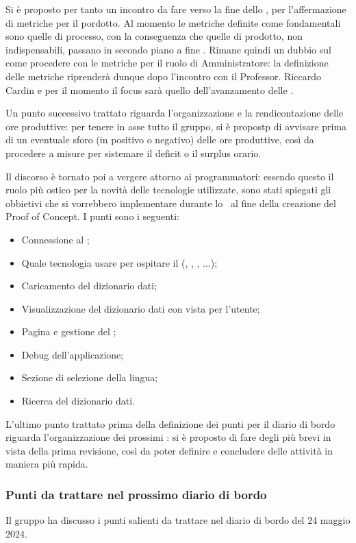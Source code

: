 Si è proposto per tanto un incontro da fare verso la fine dello , per l'affermazione di metriche per il pordotto.
Al momento le metriche definite come fondamentali sono quelle di processo, con la conseguenza che quelle di prodotto, non indispensabili, passano in secondo piano a fine .
Rimane quindi un dubbio sul come procedere con le metriche per il ruolo di Amministratore: la definizione delle metriche riprenderà dunque dopo l'incontro con il Professor. Riccardo Cardin e per il momento il focus sarà quello dell'avanzamento delle \NdP.
\par Un punto successivo trattato riguarda l'organizzazione e la rendicontazione delle ore produttive: per tenere in asse tutto il gruppo, si è propostp di avvisare prima di un eventuale sforo (in positivo o negativo) delle ore produttive, così da procedere a misure per sistemare il deficit o il surplus orario.
\par Il discorso è tornato poi a vergere attorno ai programmatori: essendo questo il ruolo più ostico per la novità delle tecnologie utilizzate, sono stati spiegati gli obbietivi che si vorrebbero implementare durante lo \ al fine della creazione del Proof of Concept. I punti sono i seguenti:
\begin{itemize}
	\item Connessione al ;
	\item Quale tecnologia usare per ospitare il  (, , , ...);
	\item Caricamento del dizionario dati;
	\item Visualizzazione del dizionario dati con vista per l'utente;
	\item Pagina e gestione del ; 
	\item Debug dell'applicazione;
	\item Sezione di selezione della lingua;
	\item Ricerca del dizionario dati.
\end{itemize}
\par L'ultimo punto trattato prima della definizione dei punti per il diario di bordo riguarda l'organizzazione dei prossimi : si è proposto di fare degli  più brevi in vista della prima revisione, così da poter definire e concludere delle attività in maniera più rapida.

\subsubsection{Punti da trattare nel prossimo diario di bordo}
\par Il gruppo ha discusso i punti salienti da trattare nel diario di bordo del 24 maggio 2024.
